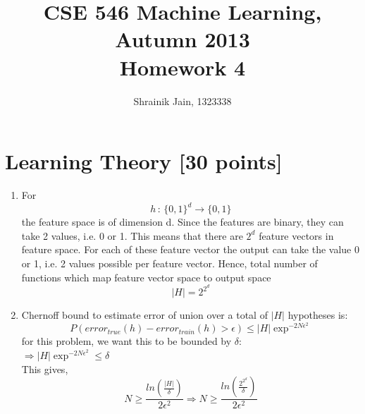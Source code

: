 \documentclass[letterpaper]{article}
\title{CSE 546 Machine Learning, Autumn 2013 \\ Homework 4}
\date{Shrainik Jain, 1323338}
\begin{document}
\maketitle

\section{Learning Theory [30 points]}


\begin{enumerate}
\item For \[h \, : \, \{ 0, 1 \}^d \rightarrow \{ 0, 1 \} \] the feature space is of dimension d. Since the features are binary, they can take 2 values, i.e. 0 or 1. This means that there are $2^d$ feature vectors in feature space. For each of these feature vector the output can take the value 0 or 1, i.e. 2 values possible per feature vector. Hence, total number of functions which map feature vector space to output space \[|H| = 2^{2^d}\]
\item Chernoff bound to estimate error of union over a total of $|H|$ hypotheses is:
\begin{equation}
P(error_{true}(h) - error_{train}(h) > \epsilon) \leq |H|\exp^{-2N\epsilon^2}
\end{equation}
for this problem, we want this to be bounded by $\delta$: \\
$\Rightarrow |H|\exp^{-2N\epsilon^2} \leq \delta $\\
This gives,
\begin{equation}
N \geq \frac{ln(\frac{|H|}{\delta})}{2\epsilon^2} \Rightarrow N \geq \frac{ln(\frac{2^{2^d}}{\delta})}{2\epsilon^2}
\end{equation}


\end{enumerate}
\end{document}
